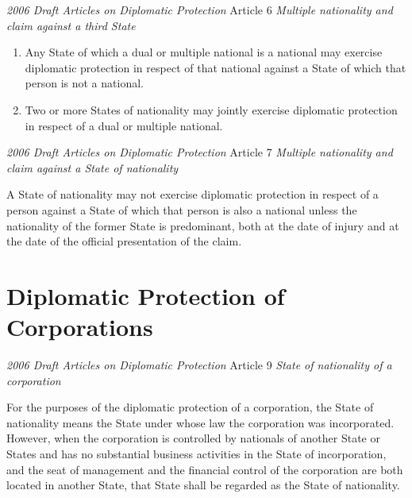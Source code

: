 \begin{conventiondetails}{\textit{2006 Draft Articles on Diplomatic Protection} Article 6}
    \flushleft
    \textit{Multiple nationality and claim against a third State}

    \begin{enumerate}
        \item Any State of which a dual or multiple national is a national may exercise diplomatic protection in respect of that national against a State of which that person is not a national. 
        \item Two or more States of nationality may jointly exercise diplomatic protection in respect of a dual or multiple national.
    \end{enumerate}
\end{conventiondetails}

\begin{conventiondetails}{\textit{2006 Draft Articles on Diplomatic Protection} Article 7}
    \flushleft
    \textit{Multiple nationality and claim against a State of nationality}

    \vspace{\baselineskip}

    A State of nationality may not exercise diplomatic protection in respect of a person against a State of which that person is also a national unless the nationality of the former State is predominant, both at the date of injury and at the date of the official presentation of the claim.
\end{conventiondetails}

\section{Diplomatic Protection of Corporations}
\begin{conventiondetails}{\textit{2006 Draft Articles on Diplomatic Protection} Article 9}
    \flushleft
    \textit{State of nationality of a corporation}
    
    \vspace{\baselineskip}

    For the purposes of the diplomatic protection of a corporation, the State of nationality means the State under whose law the corporation was incorporated. However, when the corporation is controlled by nationals of another State or States and has no substantial business activities in the State of incorporation, and the seat of management and the financial control of the corporation are both located in another State, that State shall be regarded as the State of nationality.
\end{conventiondetails}

